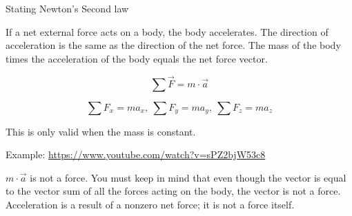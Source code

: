 \documentclass[]{beamer}
\begin{document}
\begin{frame}
Stating Newton's Second law
\pause
\vspace{5mm}

If a net external force acts on a body, the
body accelerates. The direction of acceleration is the same as the direction of the
net force. The mass of the body times the acceleration of the body equals the net
force vector.
\pause
\vspace{5mm}


\begin{equation}
  \boxed{\sum\vec{F}=m\cdot \vec{a}}
\end{equation}

\vspace{5mm}


\begin{equation*}
 \sum F_x=m a_x,~\sum F_y=m a_y,~\sum F_z=m a_z 
\end{equation*}
\pause
\vspace{5mm}

This is only valid when the mass is constant.

\pause
Example: \url{https://www.youtube.com/watch?v=sPZ2bjW53c8}

    \end{frame}




\begin{frame}

  \vspace{5mm}
  
 $m\cdot \vec{a}$ is not a force. You must keep in mind that even though the vector is
  equal to the vector sum of all the forces acting on the body, the vector is not a
  force. Acceleration is a result of a nonzero net force; it is not a force itself. 
  \pause
  
  
    \end{frame}



\end{document}
